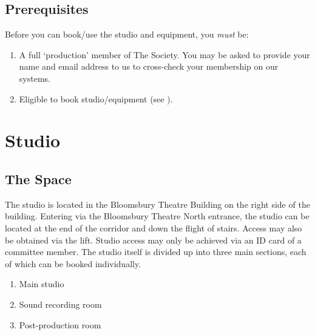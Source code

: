 \documentclass[]{article}
\begin{document}
\subsection{Prerequisites}
Before you can book/use the studio and equipment, you \textit{must} be:
\begin{enumerate}
    \item A full `production' member of The Society. You may be asked to provide your name and email address to us to cross-check your membership on our systems.
    \item Eligible to book studio/equipment (see ).
\end{enumerate}
\section{Studio}
\subsection{The Space}\label{studioSpaces}
The studio is located in the Bloomsbury Theatre Building on the right side of the building. Entering via the Bloomsbury Theatre North entrance, the studio can be located at the end of the corridor and down the flight of stairs. Access may also be obtained via the lift. Studio access may only be achieved via an ID card of a committee member. The studio itself is divided up into three main sections, each of which can be booked individually.
\begin{enumerate}
    \item Main studio
    \item Sound recording room
    \item Post-production room
\end{enumerate}
\end{document}
